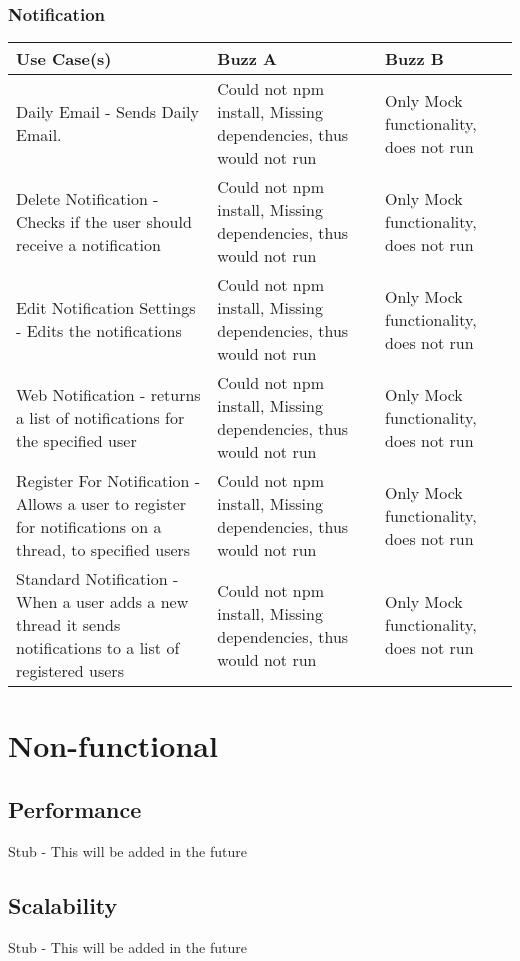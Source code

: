 \documentclass[12pt]{article}
\begin{document}
\subsubsection{Notification}%
\begin{tabular}{|p{4.5cm}|p{4.5cm}|p{4.5cm}|}

\hline
Use Case(s) & Buzz A & Buzz B \\ 
\hline
Daily Email - Sends Daily Email. & Could not npm install, Missing dependencies, thus would not run & Only Mock functionality, does not run \\ %
\hline
Delete Notification - Checks if the user should receive a notification & Could not npm install, Missing dependencies, thus would not run & Only Mock functionality, does not run\\ %
\hline
Edit Notification Settings - Edits the notifications  & Could not npm install, Missing dependencies, thus would not run & Only Mock functionality, does not run\\ %
\hline
Web Notification - returns a list of notifications for the specified user & Could not npm install, Missing dependencies, thus would not run & Only Mock functionality, does not run \\ %
\hline
Register For Notification - Allows a user to register for notifications on a thread, to specified users  & Could not npm install, Missing dependencies, thus would not run & Only Mock functionality, does not run \\ %
\hline
Standard Notification - When a user adds a new thread it sends notifications to a list of registered users & Could not npm install, Missing dependencies, thus would not run &  Only Mock functionality, does not run\\ %
\hline


\end{tabular}
\section{Non-functional} %
\subsection{Performance}
Stub - This will be added in the future
\subsection{Scalability}
Stub - This will be added in the future
\end{document}
